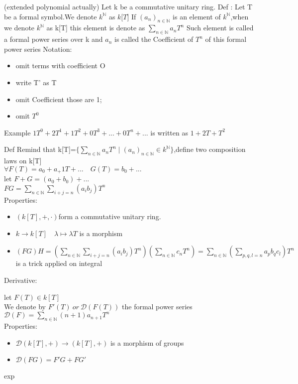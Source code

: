 \documentclass{book}
\begin{document}
(extended polynomial actually)
Let k be a commutative unitary ring.
Def : Let T be a formal symbol.We denote $k^\mathbb{N}$ as $k\mathbb{[}T\mathbf{]}$ If $(a_n)_{n\in\mathbb{N}}$ is an element of $k^\mathbb{N}$,when we denote $k^\mathbb{N}$ as k[T] this element is denote as $\sum_{n\in\mathbb{N}}a_nT^n$ Such element is called a formal power series over k and $a_n$ is called the Coefficient of $T^n$ of this formal power series
Notation: \begin{itemize}
    \item omit terms with coefficient O
    \item write T' as T
    \item omit Coefficient those are 1;
    \item omit $T^0$
\end{itemize}
Example $1T^0+2T^1+1T^2+0T^3+...+0T^n+...$ is written as $1+2T+T^2$

Def Remind that k[T]=$\{\sum_{n\in\mathbb{N}}a_nT^n\mid (a_n)_{n\in\mathbb{N}}\in k^\mathbb{N} \}$,define two composition laws on k[T]\\
$\forall F(T)=a_0+a_+1T+...\quad G(T)=b_0+...$\\
let $F+G=(a_0+b_0)+...$\\
$FG=\sum\limits_{n\in\mathbb{N}}\sum\limits_{i+j=n}(a_ib_j)T^n$\\
Properties:\begin{itemize}
\item $(k[T],+,\cdot)$form a commutative unitary ring.
\item $k\rightarrow k[T]\quad \lambda\mapsto\lambda T$ is a morphism 
\item $(FG)H=\left(\sum_{n\in\mathbb{N}}^{}\sum\limits_{i+j=n}(a_ib_j)T^n\right)(\sum\limits_{n\in\mathbb{N}}c_nT^n)=\sum\limits_{n\in\mathbb{N}}\left(\sum\limits_{p,q,l=n}a_pb_qc_l\right)T^n$\\is a trick applied on integral
\end{itemize}
Derivative:

let $F(T)\in k[T]$\\
\indent We denote by $F'(T)\ or\ \mathcal{D}(F(T))$ the formal power series\\
\indent$\mathcal{D}(F)=\sum\limits_{n\in\mathbb{N}}(n+1)a_{n+1}T^n$\\
Properties:\begin{itemize}
    \item $\mathcal{D}(k[T],+)\rightarrow(k[T],+)$ is a morphism of groups
    \item $\mathcal{D}(FG)=F'G+FG'$
\end{itemize}
exp
\end{document}
